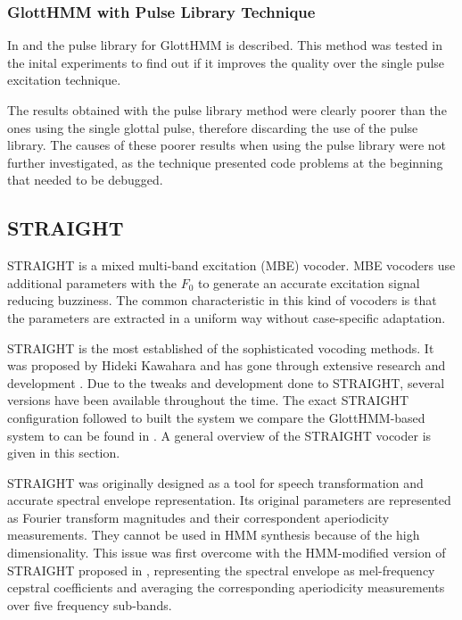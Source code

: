 \subsubsection{GlottHMM with Pulse Library Technique}
\label{vocoders_glott_pulse_library}
In \cite{TuomoMSc} and \cite{manuMSc} the pulse library for GlottHMM is described.
%
This method was tested in the inital experiments to find out if it improves the quality over the single pulse excitation technique.

The results obtained with the pulse library method were clearly poorer than the ones using the single glottal pulse, therefore discarding the use of the pulse library.
%
The causes of these poorer results when using the pulse library were not further investigated, as the technique presented code problems at the beginning that needed to be debugged.

\subsection{STRAIGHT}
\label{vocoders_straight}
STRAIGHT is a mixed multi-band excitation (MBE) vocoder.
%
MBE vocoders use additional parameters with the $F_{0}$ to generate an accurate excitation signal reducing buzziness.
%
The common characteristic in this kind of vocoders is that the parameters are extracted in a uniform way without case-specific adaptation.

STRAIGHT is the most established of the sophisticated vocoding methods.
%
It was proposed by Hideki Kawahara \cite{kawahara1997speech} and has gone through extensive research and development \cite{kawahara1999restructuring}. 
%
Due to the tweaks and development done to STRAIGHT, several versions have been available throughout the time.
%
The exact STRAIGHT configuration followed to built the system we compare the GlottHMM-based system to can be found in \cite{karhila_jstsp_14}. A general overview of the STRAIGHT vocoder is given in this section.

STRAIGHT was originally designed as a tool for speech transformation and accurate spectral envelope representation.
%
Its original parameters are represented as Fourier transform magnitudes and their correspondent aperiodicity measurements.
%
They cannot be used in HMM synthesis because of the high dimensionality. 
%
This issue was first overcome with the HMM-modified version of STRAIGHT proposed in \cite{heiga2007details}, representing the spectral envelope as mel-frequency cepstral coefficients and averaging the corresponding aperiodicity measurements over five frequency sub-bands.


